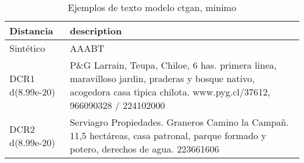 \begin{table}[H]
\centering
\fontsize{10}{14}\selectfont
\caption{Ejemplos de texto modelo ctgan, minimo}
\label{table-example-economicos-b-3-ctgan-min-text}
\begin{tabular}{|l|m{35em}|}
\hline
\rowcolor[gray]{0.8}
Distancia & description \\
\hline Sintético & AAABT \\
\hline DCR1 d(8.99e-20) & P\&G Larrain, Teupa, Chiloe, 6 has. primera linea, maravilloso jardin, praderas y bosque nativo, acogedora casa t{\'\i}pica chilota. www.pyg.cl/37612, 966090328 / 224102000 \\
\hline DCR2 d(8.99e-20) & Serviagro Propiedades. Graneros Camino la Campa\~n. 11,5 hect\'areas, casa patronal, parque formado y potero, derechos de agua. 223661606 \\
\hline
\end{tabular}
\end{table}
